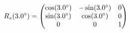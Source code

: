 \documentclass[preview]{standalone}
\begin{document}
\begin{align*}
\special{dvisvgm:raw <g id='unique000'>}R_z(3.0^\circ) = \begin{pmatrix} \cos(3.0^\circ) & -\sin(3.0^\circ) & 0 \\ \sin(3.0^\circ) & \cos(3.0^\circ) & 0 \\ 0 & 0 & 1 \end{pmatrix}\special{dvisvgm:raw </g>}
\end{align*}
\end{document}
